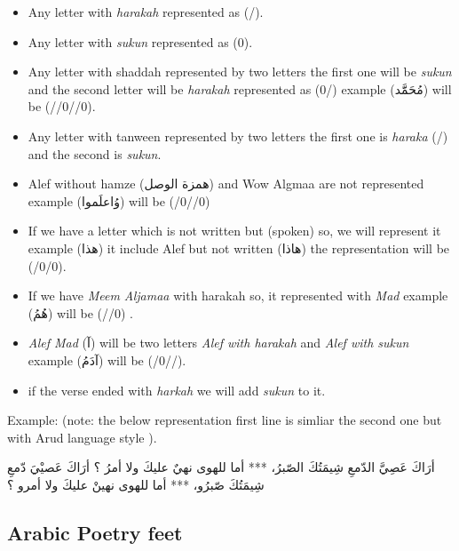  \begin{itemize}
  \item Any letter with \textit{harakah} represented as (/).
  \item Any letter with \textit{sukun} represented as (0).
  \item Any letter with shaddah represented by two letters the first one will be \textit{sukun} and the second letter will be \textit{harakah} represented as (0/) example (\textarabic{مُحَمََّد}) will be (//0//0).
  \item Any letter with tanween represented by two letters the first one is \textit{haraka} (/) and the second is \textit{sukun}.
  \item Alef without hamze (\textarabic{همزة الوصل}) and Wow Algmaa are not represented example (\textarabic{وُاعلَموا}) will be (/0//0)
  \item If we have a letter which is not written but (spoken) so, we will represent it example (\textarabic{هذا}) it include Alef but not written (\textarabic{هاذا}) the representation will be (/0/0).
  \item If we have \textit{Meem Aljamaa} with harakah so, it represented with \textit{Mad} example (\textarabic{هُمُ}) will be (//0) .
  \item \textit{Alef Mad} (\textarabic{آ}) will be two letters \textit{Alef with harakah} and \textit{Alef with sukun} example (\textarabic{آدَمُ}) will be (/0//).
    \item if the verse ended with \textit{harkah} we will add \textit{sukun} to it.


    \end{itemize}
Example: (note: the below representation first line is simliar the second one but with Arud language style ).
\begin{Arabic}
  \begin{traditionalpoem*}

    أرَاكَ عَصِيَّ الدّمعِ شِيمَتُكَ الصّبرُ، *** أما للهوى نهيٌ عليكَ ولا أمرُ ؟
     أرَاكَ عَصيْيَ دّمعِ شِيمَتُكَ صّبرُو، ***  أما للهوى نهينْ عليكَ ولا أمرو ؟
    
	\end{traditionalpoem*}
\end{Arabic}
\newpage

\subsection{Arabic Poetry feet}

